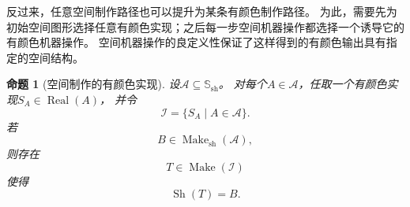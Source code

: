 \documentclass[UTF8,fontset=none]{ctexart}
\theoremstyle{cnthm}
\newtheorem{proposition}{命题}[section]
\begin{document}
			反过来，任意空间制作路径也可以提升为某条有颜色制作路径。
			为此，需要先为初始空间图形选择任意有颜色实现；之后每一步空间机器操作都选择一个诱导它的有颜色机器操作。
			空间机器操作的良定义性保证了这样得到的有颜色输出具有指定的空间结构。
			
			\begin{proposition}[空间制作的有颜色实现]\label{prop:shape-make-realization}
				设$\mathcal{A}\subseteq\mathbb{S}_{\mathrm{sh}}$。
				对每个$A\in\mathcal{A}$，任取一个有颜色实现$S_A\in\operatorname{Real}(A)$，
				并令
				$$
				\mathcal{I}
				=
				\{S_A\mid A\in\mathcal{A}\}.
				$$
				若
				$$
				B\in\operatorname{Make}_{\mathrm{sh}}(\mathcal{A}),
				$$
				则存在
				$$
				T\in\operatorname{Make}(\mathcal{I})
				$$
				使得
				$$
				\operatorname{Sh}(T)=B.
				$$
			\end{proposition}
			
\end{document}
